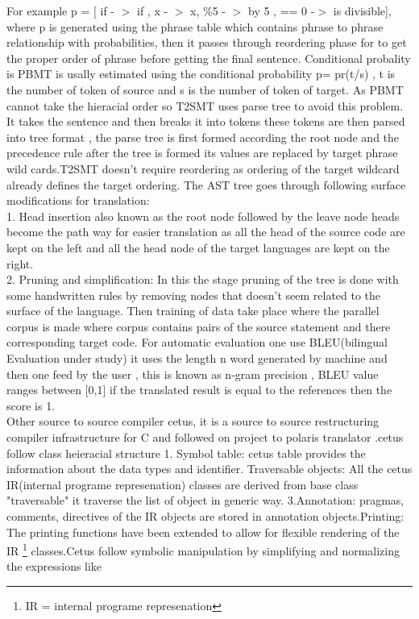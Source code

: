 \documentclass[23pt]{article}
\begin{document}
{For example p = [ if - $>$ if , x - $>$ x, \%5 - $>$ by 5 , == 0 -$>$ is divisible], where p is generated using the phrase table which contains phrase to phrase relationship with probabilities, then it passes through reordering phase for to get the proper order of phrase before getting the final sentence. Conditional probality is PBMT is usally estimated using the conditional probability p= pr(t/s) , t is the number of token of source and s is the number of token of target. As PBMT cannot take the hieracial order so T2SMT uses parse tree to avoid this problem. It takes the sentence and then breaks it into tokens these tokens are then parsed into tree format  , the parse tree is first formed according the root node and the precedence rule after the tree is formed its values are replaced by target phrase wild cards.T2SMT doesn’t require reordering as ordering of the target wildcard already defines the target ordering. The AST tree goes through following surface modifications for translation:\\
1. Head insertion also known as the root node followed by the leave node heads become the path way for easier translation as all the head of the source code are kept on the left and all the head node of the target languages are kept on the right. \\
 2. Pruning and simplification: In this the stage pruning of the tree is done with some handwritten rules by removing nodes that doesn’t seem related to the surface of the language. Then training of data take place where the parallel corpus is made where corpus contains pairs of the source statement and there corresponding target code. For automatic evaluation one use BLEU(bilingual Evaluation under study) it uses the length n word generated by machine and then one feed by the user , this is known as n-gram precision , BLEU value ranges between [0,1]  if the translated result is equal to the references then the score is 1. \\
Other source to source compiler cetus, it is a source to source restructuring compiler infrastructure for C and followed on project to polaris translator \cite{cetus}.cetus follow class heieracial structure  1. Symbol table: cetus table provides the information about the data types and identifier. Traversable objects: All the cetus  IR(internal programe represenation) classes are derived from base class "traversable" it traverse the list of object in generic way. 3.Annotation:  pragmas, comments, directives of the IR objects are stored in annotation objects.Printing: The printing functions have been extended to allow for flexible rendering of the IR \footnote{IR = internal programe represenation} classes.Cetus follow symbolic manipulation by simplifying and normalizing the expressions like 
}
\end{document}
